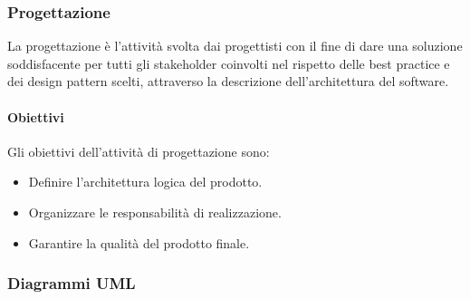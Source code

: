         \subsubsection{Progettazione}\label{PP:Sviluppo:Progettazione}
        La progettazione è l'attività svolta dai progettisti con il fine di dare una soluzione soddisfacente per tutti gli stakeholder coinvolti nel rispetto delle best practice e dei design pattern scelti, attraverso la descrizione dell'architettura del software.

		\paragraph{Obiettivi}\label{PP:Sviluppo:Progettazione:Obiettivi}
        Gli obiettivi dell'attività di progettazione sono:
        \begin{itemize}
			\item Definire l'architettura logica del prodotto.
			\item Organizzare le responsabilità di realizzazione.
			\item Garantire la qualità del prodotto finale.
		\end{itemize}
        

		\subsubsection{Diagrammi UML}\label{PP:Sviluppo:UML} %

